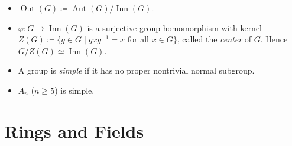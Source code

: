 \documentclass{article}
\newcommand{\aut}{\operatorname{Aut}}
\newcommand{\inn}{\operatorname{Inn}}
\renewcommand{\phi}{\varphi}
\begin{document}
\begin{itemize}
    \item $\operatorname{Out}(G) \coloneqq \aut(G)/\inn(G)$.
    \item $\phi: G \to \inn(G)$ is a surjective group homomorphism with kernel $Z(G) \coloneqq \{g \in G \mid g x g^{-1} = x \text{ for all } x \in G\}$, called the \textit{center} of $G$. Hence $G/Z(G) \simeq \inn(G)$.
    \item A group is \textit{simple} if it has no proper nontrivial normal subgroup.
    \item $A_n$ ($n \geq 5$) is simple.
\end{itemize}

\section{Rings and Fields}
\end{document}
